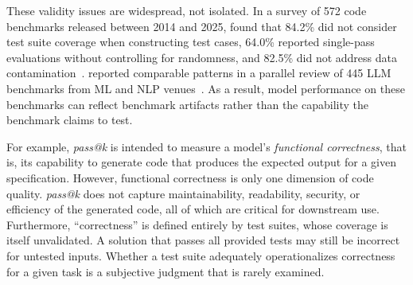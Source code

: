 These validity issues are widespread, not isolated. In a survey of 572 code benchmarks released between 2014 and 2025, \citeauthor{cao2025should} found that 84.2\% did not consider test suite coverage when constructing test cases, 64.0\% reported single-pass evaluations without controlling for randomness, and 82.5\% did not address data contamination~\cite{cao2025should}. \citeauthor{bean2025measuring} reported comparable patterns in a parallel review of 445 LLM benchmarks from ML and NLP venues~\cite{bean2025measuring}. As a result, model performance on these benchmarks can reflect benchmark artifacts rather than the capability the benchmark claims to test.

For example, \emph{pass@k} is intended to measure a model's \textit{functional correctness}, that is, its capability to generate code that produces the expected output for a given specification. However, functional correctness is only one dimension of code quality. \emph{pass@k} does not capture maintainability, readability, security, or efficiency of the generated code, all of which are critical for downstream use. Furthermore, ``correctness'' is defined entirely by test suites, whose coverage is itself unvalidated. A solution that passes all provided tests may still be incorrect for untested inputs. Whether a test suite adequately operationalizes correctness for a given task is a subjective judgment that is rarely examined.

